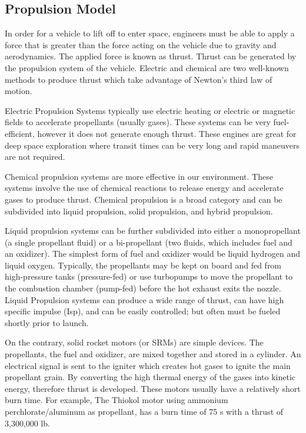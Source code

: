 \documentclass{article}
\begin{document}
\subsection{Propulsion Model}

In order for a vehicle to lift off to enter space, engineers must be
able to apply a force that is greater than the force acting on the
vehicle due to gravity and aerodynamics.  The applied force is known
as thrust. Thrust can be generated by the propulsion system of the
vehicle. Electric and chemical are two well-known methods to produce
thrust which take advantage of Newton’s third law of motion.

Electric Propulsion Systems typically use electric heating or electric
or magnetic fields to accelerate propellants (usually gases).  These
systems can be very fuel-efficient, however it does not generate
enough thrust. These engines are great for deep space exploration
where transit times can be very long and rapid maneuvers are not
required\cite{qp8}.

Chemical propulsion systems are  more effective in our
environment. These systems involve the use of chemical reactions to
release energy and accelerate gases to produce thrust. Chemical
propulsion is a broad category and can be subdivided into liquid
propulsion, solid propulsion, and hybrid propulsion.

Liquid propulsion systems can be further subdivided into either a
monopropellant (a single propellant fluid) or a bi-propellant (two
fluids, which includes fuel and an oxidizer). The simplest form of
fuel and oxidizer would be liquid hydrogen and liquid
oxygen. Typically, the propellants may be kept on board and fed from
high-pressure tanks (pressure-fed) or use turbopumps to move the
propellant to the combustion  chamber (pump-fed) before the hot
exhaust exits the nozzle. Liquid Propulsion systems can produce a wide
range of thrust, can have high specific impulse (Isp), and can be
easily controlled; but often must be fueled shortly prior to launch.

On the contrary, solid rocket motors (or SRMs) are simple devices. The
propellants, the fuel and oxidizer, are mixed together and stored in a
cylinder. An electrical signal is sent to the igniter which creates
hot gases to ignite the main propellant grain. By converting the high
thermal energy of the gases into kinetic energy, therefore thrust is
developed. These motors usually have a relatively short burn time. For
example, The Thiokol motor using ammonium perchlorate/aluminum as
propellant, has a burn time of 75 s with a thrust of 3,300,000 lb.
\end{document}
